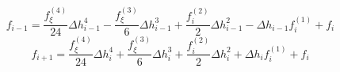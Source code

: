 \begin{equation} 
f_{{i-1}} = \frac{f^{{(4)}}_{{\xi}}}{24} \Delta h_{{i-1}}^{4} - \frac{f^{{(3)}}_{{\xi}}}{6} \Delta h_{{i-1}}^{3} + \frac{f^{{(2)}}_{i}}{2} \Delta h_{{i-1}}^{2} - \Delta h_{{i-1}} f^{{(1)}}_{i} + f_{i}
 \end{equation}\begin{equation} 
f_{{i+1}} = \frac{f^{{(4)}}_{{\xi}}}{24} \Delta h_{{i}}^{4} + \frac{f^{{(3)}}_{{\xi}}}{6} \Delta h_{{i}}^{3} + \frac{f^{{(2)}}_{i}}{2} \Delta h_{{i}}^{2} + \Delta h_{{i}} f^{{(1)}}_{i} + f_{i}
 \end{equation}